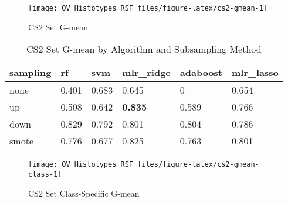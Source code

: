 \documentclass[
]{report}
\begin{document}
\begin{figure}[H]

{\centering \texttt{[image: OV\_Histotypes\_RSF\_files/figure-latex/cs2-gmean-1]} 

}

\caption{CS2 Set G-mean}\label{fig:cs2-gmean}
\end{figure}

\begin{table}

\caption{\label{tab:cs2-gmean-table}CS2 Set G-mean by Algorithm and Subsampling Method}
\centering
\begin{tabular}[t]{l|l|l|l|l|l}
\hline
sampling & rf & svm & mlr\_ridge & adaboost & mlr\_lasso\\
\hline
none & 0.401 & 0.683 & 0.645 & 0 & 0.654\\
\hline
up & 0.508 & 0.642 & \textbf{0.835} & 0.589 & 0.766\\
\hline
down & 0.829 & 0.792 & 0.801 & 0.804 & 0.786\\
\hline
smote & 0.776 & 0.677 & 0.825 & 0.763 & 0.801\\
\hline
\end{tabular}
\end{table}

\begin{figure}[H]

{\centering \texttt{[image: OV\_Histotypes\_RSF\_files/figure-latex/cs2-gmean-class-1]} 

}

\caption{CS2 Set Class-Specific G-mean}\label{fig:cs2-gmean-class}
\end{figure}
\end{document}
